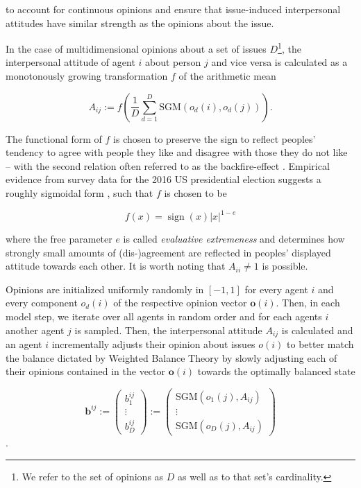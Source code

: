 \documentclass[11pt]{article}
\DeclareMathOperator{\sign}{sign}
\begin{document}
to account for continuous opinions and ensure that issue-induced interpersonal attitudes have similar strength as the opinions about the issue. 

In the case of multidimensional opinions about a set of issues $D$\footnote{We refer to the set of opinions as $D$ as well as to that set's cardinality.}, the interpersonal attitude of agent $i$ about person $j$ and vice versa is calculated as a monotonously growing transformation $f$ of the arithmetic mean

\[A_{ij}:=f\left(\frac{1}{D}\sum_{d=1}^{D}\text{SGM}(o_{d}(i),o_{d}(j))\right).\] 

The functional form of $f$ is chosen to preserve the sign to reflect peoples' tendency to agree with people they like and disagree with those they do not like -- with the second relation often referred to as the backfire-effect \citep{wood2019elusive,bail2018exposure}. Empirical evidence from survey data for the 2016 US presidential election suggests a roughly sigmoidal form \citep{schweighofer2020}, such that
$f$ is chosen to be

\[
f(x) = \sign{(x)}|x|^{1-e}
\]

where the free parameter $e$ is called \textit{evaluative extremeness} and determines how strongly small amounts of (dis-)agreement are reflected in peoples' displayed attitude towards each other. It is worth noting that $A_{ii} \neq 1$ is possible.

Opinions are initialized uniformly randomly in $[-1,1]$ for every agent $i$ and every component $o_d(i)$ of the respective opinion vector $\mathbf{o}(i)$. Then, in each model step, we iterate over all agents in random order and for each agents $i$ another agent $j$ is sampled. Then, the interpersonal attitude $A_{ij}$ is calculated and an agent $i$ incrementally adjusts their opinion about issues $o(i)$ to better match the balance dictated by Weighted Balance Theory by slowly adjusting each of their opinions contained in the vector $\mathbf{o}(i)$ towards the optimally balanced state 

\[ 
\mathbf{b}^{ij} := \begin{pmatrix} 
{b}^{ij}_1  \\
\vdots \\
{b}^{ij}_D
\end{pmatrix} :=
\begin{pmatrix}
\text{SGM}(o_1(j),A_{ij})  \\
\vdots \\
\text{SGM}(o_D(j),A_{ij})
\end{pmatrix}
\]. 
\end{document}

